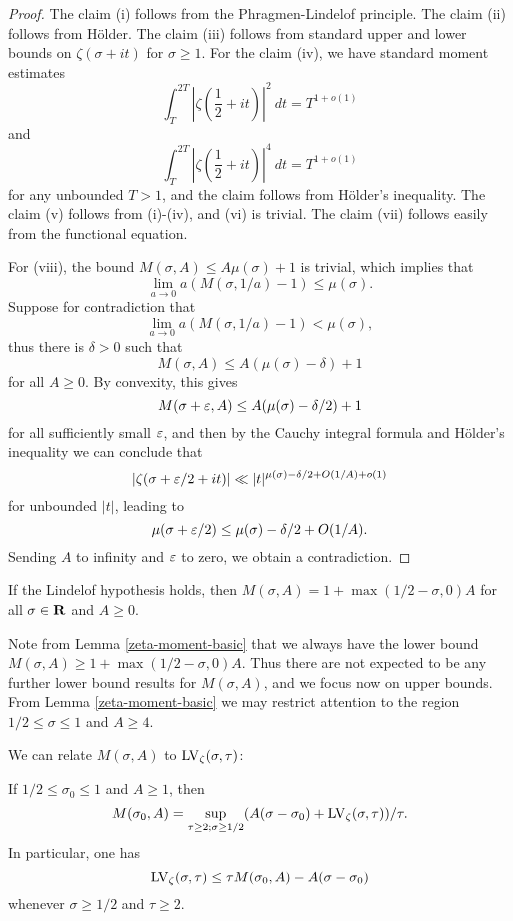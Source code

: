 \begin{proof} The claim (i) follows from the Phragmen-Lindelof principle.  The claim (ii) follows from H\"older.  The claim (iii) follows from standard upper and lower bounds on $\zeta(\sigma+it)$ for $\sigma \geq 1$.  For the claim (iv), we have standard moment estimates
$$ \int_T^{2T} |\zeta(\frac{1}{2}+it)|^2\ dt = T^{1+o(1)}$$
and
$$ \int_T^{2T} |\zeta(\frac{1}{2}+it)|^4\ dt = T^{1+o(1)}$$
for any unbounded $T>1$, and the claim follows from H\"older's inequality.  The claim (v) follows from (i)-(iv), and (vi) is trivial. The claim (vii) follows easily from the functional equation.

For (viii), the bound $M(\sigma,A) \leq A \mu(\sigma) + 1$ is trivial, which implies that
$$ \lim_{a \to 0} a(M(\sigma,1/a)-1) \leq \mu(\sigma).$$
Suppose for contradiction that
$$ \lim_{a \to 0} a(M(\sigma,1/a)-1) < \mu(\sigma),$$
thus there is $\delta>0$ such that
$$M(\sigma,A) \leq A (\mu(\sigma)-\delta) + 1$$
for all $A\geq 0$.  By convexity, this gives
$$M(\sigma+\varepsilon,A) \leq A (\mu(\sigma)-\delta/2) + 1$$
for all sufficiently small $\varepsilon$, and then by the Cauchy integral formula and H\"older's inequality we can conclude that
$$ |\zeta(\sigma+\varepsilon/2 +it)| \ll |t|^{\mu(\sigma)-\delta/2 + O(1/A) + o(1)} $$
for unbounded $|t|$, leading to
$$ \mu(\sigma+\varepsilon/2) \leq \mu(\sigma)-\delta/2 + O(1/A).$$
Sending $A$ to infinity and $\varepsilon$ to zero, we obtain a contradiction.
\end{proof}

\begin{corollary}\label{moment_from_lindelof} If the Lindelof hypothesis holds, then $M(\sigma,A) = 1 + \max(1/2-\sigma,0) A$ for all $\sigma \in \mathbf{R}$ and $A \geq 0$.
\end{corollary}

Note from Lemma \ref{zeta-moment-basic} that we always have the lower bound $M(\sigma,A) \geq 1 + \max(1/2-\sigma,0) A$.  Thus there are not expected to be any further lower bound results for $M(\sigma,A)$, and we focus now on upper bounds.  From Lemma \ref{zeta-moment-basic} we may restrict attention to the region $1/2 \leq \sigma \leq 1$ and $A \geq 4$.

We can relate $M(\sigma,A)$ to $\mathrm{LV}_\zeta(\sigma,\tau)$:

\begin{lemma}\label{mad}  If $1/2 \leq \sigma_0 \leq 1$ and $A \geq 1$, then
\begin{equation}\label{M-form}
 M(\sigma_0,A) = \sup_{\tau \geq 2; \sigma \geq 1/2} (A(\sigma-\sigma_0) + \mathrm{LV}_\zeta(\sigma,\tau))/\tau.
\end{equation}
In particular, one has
$$ \mathrm{LV}_\zeta(\sigma,\tau) \leq \tau M(\sigma_0,A) - A(\sigma-\sigma_0)$$
whenever $\sigma \geq 1/2$ and $\tau \geq 2$.
\end{lemma}

